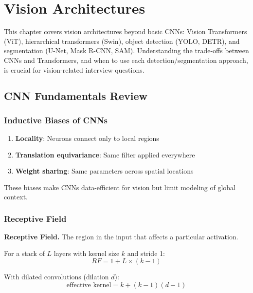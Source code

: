 \chapter{Vision Architectures}
\label{chap:vision_architectures}

\begin{tldr}
This chapter covers vision architectures beyond basic CNNs: Vision Transformers (ViT), hierarchical transformers (Swin), object detection (YOLO, DETR), and segmentation (U-Net, Mask R-CNN, SAM). Understanding the trade-offs between CNNs and Transformers, and when to use each detection/segmentation approach, is crucial for vision-related interview questions.
\end{tldr}

\section{CNN Fundamentals Review}
\label{sec:cnn_review}

\subsection{Inductive Biases of CNNs}

\begin{enumerate}
    \item \textbf{Locality}: Neurons connect only to local regions
    \item \textbf{Translation equivariance}: Same filter applied everywhere
    \item \textbf{Weight sharing}: Same parameters across spatial locations
\end{enumerate}

These biases make CNNs data-efficient for vision but limit modeling of global context.

\subsection{Receptive Field}

\textbf{Receptive Field.} The region in the input that affects a particular activation.

For a stack of $L$ layers with kernel size $k$ and stride 1:
\begin{equation}
RF = 1 + L \times (k - 1)
\end{equation}

With dilated convolutions (dilation $d$):
\begin{equation}
\text{effective kernel} = k + (k-1)(d-1)
\end{equation}

